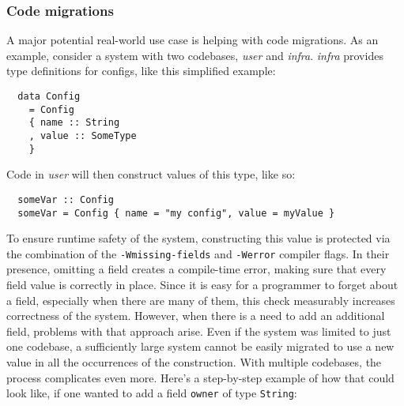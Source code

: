 \documentclass[en]{pracamgr}
\newcommand{\code}[1]{\lstinline[breaklines=true]{#1}}
\begin{document}
\subsubsection{Code migrations}
\newcommand{\user}{\textit{user}}
\newcommand{\infra}{\textit{infra}}
A major potential real-world use case is helping with code migrations.
As an example, consider a system with two codebases, \user{} and \infra{}. 
\infra{} provides type definitions for configs, like this simplified example:\\
\begin{minipage}{\linewidth}
\begin{lstlisting}
  data Config 
    = Config
    { name :: String
    , value :: SomeType
    }
\end{lstlisting}
\end{minipage}
Code in \user{} will then construct values of this type, like so:\\
\begin{minipage}{\linewidth}
\begin{lstlisting}
  someVar :: Config
  someVar = Config { name = "my config", value = myValue }
\end{lstlisting}
\end{minipage}
To ensure runtime safety of the system, constructing this value is protected via the combination of the 
\code{-Wmissing-fields} and \code{-Werror} compiler flags. 
In their presence, omitting a field creates a compile-time error, making sure that every field value is correctly in place.
Since it is easy for a programmer to forget about a field, especially when there are many of them, this check
measurably increases correctness of the system. 
However, when there is a need to add an additional field, problems with that approach arise. 
Even if the system was limited to just one codebase, a sufficiently large system cannot be easily migrated to use a new value
in all the occurrences of the construction. With multiple codebases, the process complicates even more. Here's a step-by-step
example of how that could look like, if one wanted to add a field \code{owner} of type \code{String}:
\newcommand{\defaultconf}{\code{defaultConfig}}
\newcommand{\conf}{\code{Config}}
\end{document}
